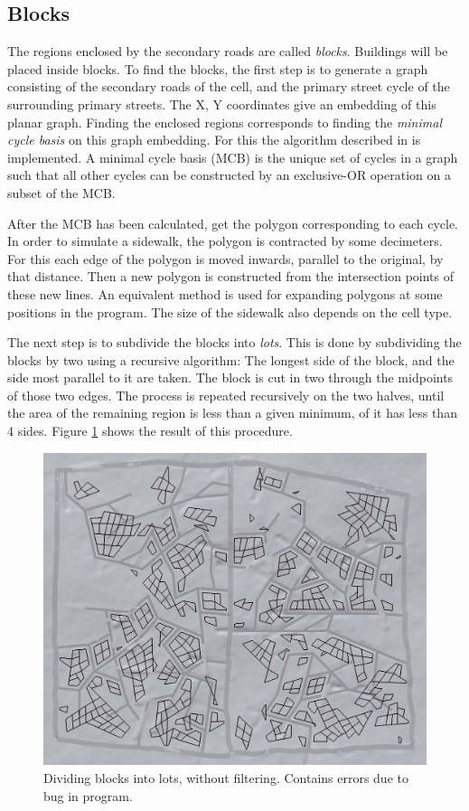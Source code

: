 \documentclass[a4paper,12pt]{scrartcl}
\begin{document}
\subsection{Blocks}
The regions enclosed by the secondary roads are called \emph{blocks}. Buildings will be placed inside blocks. To find the blocks, the first step is to generate a graph consisting of the secondary roads of the cell, and the primary street cycle of the surrounding primary streets. The X, Y coordinates give an embedding of this planar graph. Finding the enclosed regions corresponds to finding the \emph{minimal cycle basis} on this graph embedding. For this the algorithm described in \cite{Eber2005} is implemented. A minimal cycle basis (MCB) is the unique set of cycles in a graph such that all other cycles can be constructed by an exclusive-OR operation on a subset of the MCB.

After the MCB has been calculated, get the polygon corresponding to each cycle. In order to simulate a sidewalk, the polygon is contracted by some decimeters. For this each edge of the polygon is moved inwards, parallel to the original, by that distance. Then a new polygon is constructed from the intersection points of these new lines. An equivalent method is used for expanding polygons at some positions in the program. The size of the sidewalk also depends on the cell type.

The next step is to subdivide the blocks into \emph{lots}. This is done by subdividing the blocks by two using a recursive algorithm: The longest side of the block, and the side most parallel to it are taken. The block is cut in two through the midpoints of those two edges. The process is repeated recursively on the two halves, until the area of the remaining region is less than a given minimum, of it has less than 4 sides. Figure \ref{fig:alllots} shows the result of this procedure.

\begin{figure}[h]
\center
\includegraphics[width=\textwidth]{alllots.png}
\caption{Dividing blocks into lots, without filtering. Contains errors due to bug in program.}
\label{fig:alllots}
\end{figure}
\end{document}

